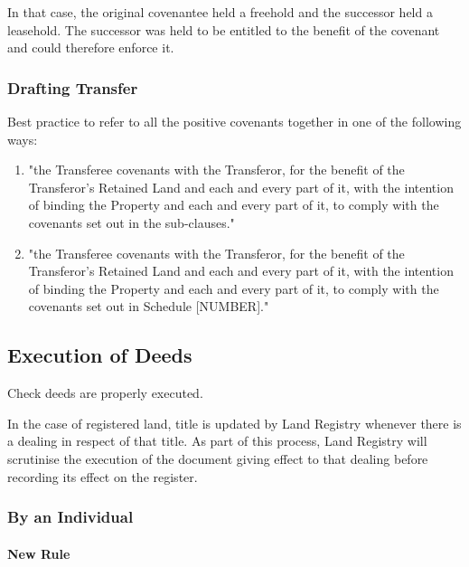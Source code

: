 \documentclass[
]{article}
\providecommand{\tightlist}{%
  \setlength{\itemsep}{0pt}\setlength{\parskip}{0pt}}
\begin{document}
In that case, the original covenantee held a freehold and the successor
held a leasehold. The successor was held to be entitled to the benefit
of the covenant and could therefore enforce it.

\hypertarget{drafting-transfer}{%
\subsubsection{Drafting Transfer}\label{drafting-transfer}}

Best practice to refer to all the positive covenants together in one of
the following ways:

\begin{enumerate}
\tightlist
\item
  "the Transferee covenants with the Transferor, for the benefit of the
  Transferor's Retained Land and each and every part of it, with the
  intention of binding the Property and each and every part of it, to
  comply with the covenants set out in the sub-clauses."
\item
  "the Transferee covenants with the Transferor, for the benefit of the
  Transferor's Retained Land and each and every part of it, with the
  intention of binding the Property and each and every part of it, to
  comply with the covenants set out in Schedule {[}NUMBER{]}."
\end{enumerate}

\hypertarget{execution-of-deeds}{%
\subsection{Execution of Deeds}\label{execution-of-deeds}}

Check deeds are properly executed.

In the case of registered land, title is updated by Land Registry
whenever there is a dealing in respect of that title. As part of this
process, Land Registry will scrutinise the execution of the document
giving effect to that dealing before recording its effect on the
register.

\hypertarget{by-an-individual}{%
\subsubsection{By an Individual}\label{by-an-individual}}

\hypertarget{new-rule}{%
\paragraph{New Rule}\label{new-rule}}
\end{document}
